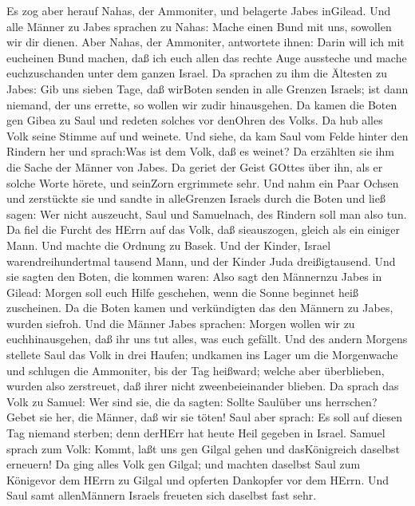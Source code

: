  Es zog aber herauf Nahas, der Ammoniter, und belagerte
Jabes inGilead. Und alle Männer zu Jabes sprachen zu Nahas: Mache einen
Bund mit uns, sowollen wir dir dienen.  Aber Nahas, der
Ammoniter, antwortete ihnen: Darin will ich mit eucheinen Bund machen,
daß ich euch allen das rechte Auge aussteche und mache euchzuschanden
unter dem ganzen Israel.  Da sprachen zu ihm die Ältesten zu
Jabes: Gib uns sieben Tage, daß wirBoten senden in alle Grenzen Israels;
ist dann niemand, der uns errette, so wollen wir zudir hinausgehen.
 Da kamen die Boten gen Gibea zu Saul und redeten solches
vor denOhren des Volks. Da hub alles Volk seine Stimme auf und weinete.
 Und siehe, da kam Saul vom Felde hinter den Rindern her und
sprach:Was ist dem Volk, daß es weinet? Da erzählten sie ihm die Sache
der Männer von Jabes.  Da geriet der Geist GOttes über ihn,
als er solche Worte hörete, und seinZorn ergrimmete sehr. 
Und nahm ein Paar Ochsen und zerstückte sie und sandte in alleGrenzen
Israels durch die Boten und ließ sagen: Wer nicht auszeucht, Saul und
Samuelnach, des Rindern soll man also tun. Da fiel die Furcht des HErrn
auf das Volk, daß sieauszogen, gleich als ein einiger Mann. 
Und machte die Ordnung zu Basek. Und der Kinder, Israel
warendreihundertmal tausend Mann, und der Kinder Juda dreißigtausend.
 Und sie sagten den Boten, die kommen waren: Also sagt den
Männernzu Jabes in Gilead: Morgen soll euch Hilfe geschehen, wenn die
Sonne beginnet heiß zuscheinen. Da die Boten kamen und verkündigten das
den Männern zu Jabes, wurden siefroh.  Und die Männer Jabes
sprachen: Morgen wollen wir zu euchhinausgehen, daß ihr uns tut alles,
was euch gefällt.  Und des andern Morgens stellete Saul das
Volk in drei Haufen; undkamen ins Lager um die Morgenwache und schlugen
die Ammoniter, bis der Tag heißward; welche aber überblieben, wurden
also zerstreuet, daß ihrer nicht zweenbeieinander blieben. 
Da sprach das Volk zu Samuel: Wer sind sie, die da sagten: Sollte
Saulüber uns herrschen? Gebet sie her, die Männer, daß wir sie töten!
 Saul aber sprach: Es soll auf diesen Tag niemand sterben;
denn derHErr hat heute Heil gegeben in Israel.  Samuel
sprach zum Volk: Kommt, laßt uns gen Gilgal gehen und dasKönigreich
daselbst erneuern!  Da ging alles Volk gen Gilgal; und
machten daselbst Saul zum Königevor dem HErrn zu Gilgal und opferten
Dankopfer vor dem HErrn. Und Saul samt allenMännern Israels freueten
sich daselbst fast sehr.

